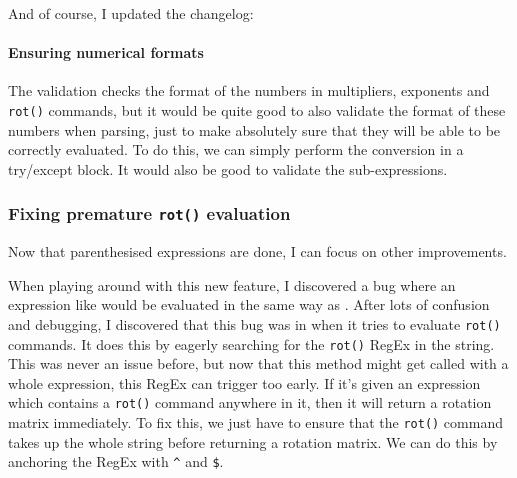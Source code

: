 \documentclass[../development.tex]{subfiles}
\begin{document}



And of course, I updated the changelog:


\paragraph{Ensuring numerical formats\label{development:making-v0.2.2:parsing-parentheses:ensuring-numerical-formats}}

The validation checks the format of the numbers in multipliers, exponents and \texttt{rot()} commands, but it would be quite good to also validate the format of these numbers when parsing, just to make absolutely sure that they will be able to be correctly evaluated. To do this, we can simply perform the conversion in a try/except block. It would also be good to validate the sub-expressions.


\subsubsection{Fixing premature \texttt{rot()} evaluation\label{development:making-v0.2.2:fixing-premature-rot-evaluation}}

Now that parenthesised expressions are done, I can focus on other improvements.

When playing around with this new feature, I discovered a bug where an expression like  would be evaluated in the same way as . After lots of confusion and debugging, I discovered that this bug was in  when it tries to evaluate \texttt{rot()} commands. It does this by eagerly searching for the \texttt{rot()} RegEx in the string. This was never an issue before, but now that this method might get called with a whole expression, this RegEx can trigger too early. If it's given an expression which contains a \texttt{rot()} command anywhere in it, then it will return a rotation matrix immediately. To fix this, we just have to ensure that the \texttt{rot()} command takes up the whole string before returning a rotation matrix. We can do this by anchoring the RegEx with \texttt{\textasciicircum} and \texttt{\$}.
\end{document}
